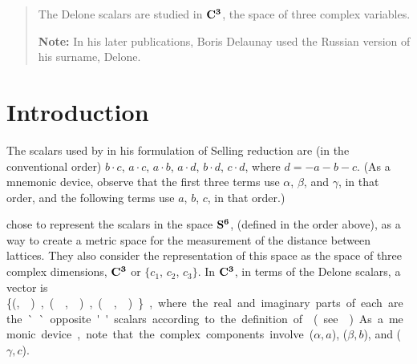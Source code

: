 \documentclass[]{iucr}              %
\numberwithin{equation}{section}
\newcommand{\SVI}[0]{$\bf{S^{6}}$}
\newcommand{\CIII}[0]{$\bf{C^{3}}$}
\begin{document}
	\newcommand{\ci}[0]{$c_1$}
	\newcommand{\cii}[0]{$c_2$}
	\newcommand{\ciii}[0]{$c_3$}
	
	
	\begin{abstract}
		
		The Delone scalars are studied in \CIII, the space of three complex variables.
		
		{\bf Note:}  In his later publications, Boris Delaunay used the Russian version of his surname, Delone.\\
		
		
	\end{abstract}
	
	
	
	
	
	
	
	\section{Introduction}
	
	The scalars used by  in his formulation of Selling reduction \cite{Selling1874}
	are (in the conventional order) $b \cdot c$, $a \cdot c$, $a \cdot b$, $a \cdot d$, 
	$b \cdot d$, $c \cdot d$, where $d = -a-b-c$. (As a mnemonic device, observe that the first three terms use
	$\alpha$, $\beta$, and $\gamma$, in that order, and the following terms use $a$, $b$, $c$, in that order.)
	
	 chose to represent the scalars in the space \SVI{},
	\Svec{} (defined in the order above), as a way to create a metric space
	for the measurement of the distance between lattices. They also consider the representation of this space as the
	space of three complex dimensions, \CIII{} or {$\{c_1$}, {$c_2$}, {$c_3\}$}. 	
	In \CIII{}, in terms of the Delone scalars, a vector is \{(\si,\siv ), (\sii,\sv),(\siii,\svi)\}, where the real and imaginary parts
	of each are the ``opposite'' scalars according to the definition of  (see ).
	As a memonic device, note that the complex components involve ($\alpha,a$), ($\beta, b$), and ($\gamma,c$).
	
\end{document}
